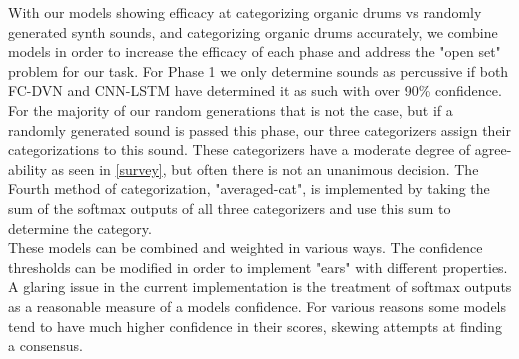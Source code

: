 \documentclass{nime-alternate} %
\begin{document}
With our models showing efficacy at categorizing organic drums vs randomly generated synth sounds, and categorizing organic drums accurately, we combine models in order to increase the efficacy of each phase and address the "open set" problem for our task. For Phase 1 we only determine sounds as percussive if both FC-DVN and CNN-LSTM have determined it as such with over 90\% confidence. For the majority of our random generations that is not the case, but if a randomly generated sound is passed this phase, our three categorizers assign their categorizations to this sound. These categorizers have a moderate degree of agree-ability as seen in \ref{survey}, but often there is not an unanimous decision. The Fourth method of categorization, "averaged-cat", is implemented by taking the sum of the softmax outputs of all three categorizers and use this sum to determine the category. \\
These models can be combined and weighted in various ways. The confidence thresholds can be modified in order to implement "ears" with different properties. A glaring issue in the current implementation is the treatment of softmax outputs as a reasonable measure of a models confidence. For various reasons some models tend to have much higher confidence in their scores, skewing attempts at finding a consensus. 

%
\end{document}
